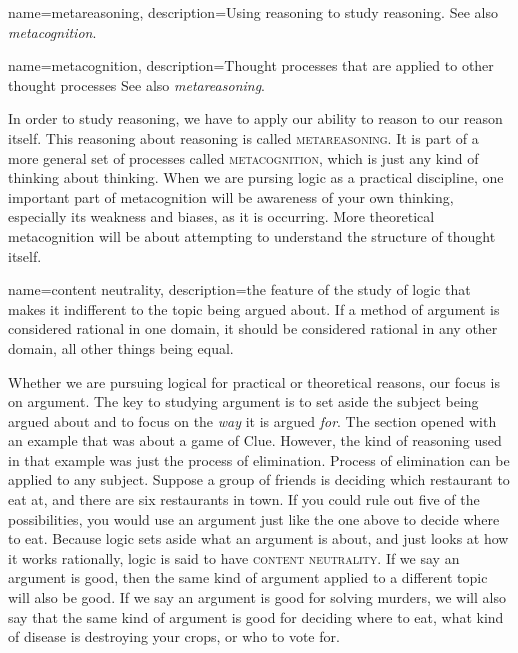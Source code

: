 {
name=metareasoning,
description={Using reasoning to study reasoning. See also \emph{metacognition}.}
}

{
name=metacognition,
description={Thought processes that are applied to other thought processes See also \emph{metareasoning}.}
}

In order to study reasoning, we have to apply our ability to reason to our reason itself. This reasoning about reasoning is called \textsc{\gls{metareasoning}}\label{def:Metareasoning}. It is part of a more general set of processes called \textsc{\gls{metacognition}}\label{def:Metacognition}, which is just any kind of thinking about thinking. When we are pursing logic as a practical discipline, one important part of metacognition will be awareness of your own thinking, especially its weakness and biases, as it is occurring. More theoretical metacognition will be about attempting to understand the structure of thought itself. 


{
name=content neutrality,
description={the feature of the study of logic that makes it indifferent to the topic being argued about. If a method of argument is considered rational in one domain, it should be considered rational in any other domain, all other things being equal.}
}

Whether we are pursuing logical for practical or theoretical reasons, our focus is on argument. The key to studying argument is to set aside the subject being argued about and to focus on the \emph{way} it is argued \emph{for}. The section opened with an example that was about a game of Clue. However, the kind of reasoning used in that example was just the process of elimination. Process of elimination can be applied to any subject. Suppose a group of friends is deciding which restaurant to eat at, and there are six restaurants in town. If you could rule out five of the possibilities, you would use an argument just like the one above to decide where to eat. Because logic sets aside what an argument is about, and just looks at how it works rationally, logic is said to have \textsc{\gls{content neutrality}}. \label{def:content_neutrality} If we say an argument is good, then the same kind of argument applied to a different topic will also be good.  If we say an argument is good for solving murders, we will also say that the same kind of argument is good for deciding where to eat, what kind of disease is destroying your crops, or who to vote for. 

